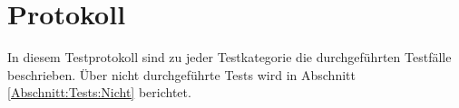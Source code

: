%



\newpage



\section{Protokoll}
\label{Abschnitt:Tests:Protokoll}

In diesem Testprotokoll sind zu jeder Testkategorie die durchgeführten Testfälle beschrieben. Über nicht durchgeführte Tests wird in Abschnitt \ref*{Abschnitt:Tests:Nicht} berichtet.









